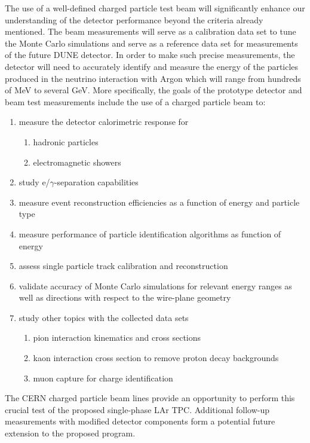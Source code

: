 The use of a well-defined charged particle test beam will significantly enhance our understanding of the detector performance beyond the criteria already mentioned.
The beam measurements will serve as a calibration data set to tune the Monte Carlo simulations and serve as a reference data set for measurements of the future DUNE detector. 
%
In order to make such precise measurements, the detector will need to accurately identify and measure the energy of the particles produced in the neutrino interaction with Argon which will range from hundreds of MeV to several GeV.
%
More specifically, the goals of the prototype detector and beam test measurements include the use of a charged particle beam to:
\begin{enumerate}
\item measure the detector calorimetric response for
\begin{enumerate}
	\item hadronic particles
	\item electromagnetic showers
\end{enumerate}
\item study e/$\gamma$-separation capabilities
\item measure event reconstruction efficiencies as a function of energy and particle type
\item measure performance of particle identification algorithms as function of energy 
\item assess single particle track calibration and reconstruction
\item validate accuracy of Monte Carlo simulations for relevant energy ranges as well as directions with respect to the wire-plane geometry

\item study other topics with the collected data sets
 \begin{enumerate}
    \item pion interaction kinematics and cross sections
    \item kaon interaction cross section to remove proton decay backgrounds
    \item muon capture for charge identification
 \end{enumerate}
\end{enumerate}
%
The CERN charged particle beam lines provide an opportunity to perform this crucial test of the 
proposed single-phase LAr TPC.
%
%
Additional follow-up measurements with modified detector components form a potential future extension 
to the proposed program.\\



